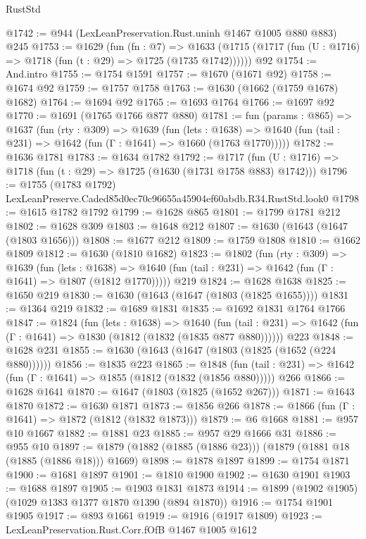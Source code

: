 \begin{lexlean}{RustStd}
\begin{coremodule}
@1742 := @944 (LexLeanPreservation.Rust.uninh @1467 @1005 @880 @883) @245
@1753 := @1629
    (fun (fn : @7) =>
    @1633 (@1715 (@1717 (fun (U : @1716) => @1718 (fun (t : @29) => @1725 (@1735 @1742))))))
    @92
@1754 := And.intro
@1755 := @1754 @1591
@1757 := @1670 (@1671 @92)
@1758 := @1674 @92
@1759 := @1757 @1758
@1763 := @1630 (@1662 (@1759 @1678) @1682)
@1764 := @1694 @92
@1765 := @1693 @1764
@1766 := @1697 @92
@1770 := @1691 (@1765 @1766 @877 @880)
@1781 := fun (params : @865) =>
  @1637
    (fun (rty : @309) =>
    @1639
      (fun (lets : @1638) =>
      @1640 (fun (tail : @231) => @1642 (fun (Γ : @1641) => @1660 (@1763 @1770)))))
@1782 := @1636 @1781
@1783 := @1634 @1782
@1792 := @1717 (fun (U : @1716) => @1718 (fun (t : @29) => @1725 (@1630 (@1731 @1758 @883) @1742)))
@1796 := @1755 (@1783 @1792) LexLeanPreserve.Caded85d0ec70c96655a45904ef60abdb.R34.RustStd.look0
@1798 := @1615 @1782 @1792
@1799 := @1628 @865
@1801 := @1799 @1781 @212
@1802 := @1628 @309
@1803 := @1648 @212
@1807 := @1630 (@1643 (@1647 (@1803 @1656)))
@1808 := @1677 @212
@1809 := @1759 @1808
@1810 := @1662 @1809
@1812 := @1630 (@1810 @1682)
@1823 := @1802
    (fun (rty : @309) =>
    @1639
      (fun (lets : @1638) =>
      @1640 (fun (tail : @231) => @1642 (fun (Γ : @1641) => @1807 (@1812 @1770)))))
    @219
@1824 := @1628 @1638
@1825 := @1650 @219
@1830 := @1630 (@1643 (@1647 (@1803 (@1825 @1655))))
@1831 := @1364 @219
@1832 := @1689 @1831
@1835 := @1692 @1831 @1764 @1766
@1847 := @1824
    (fun (lets : @1638) =>
    @1640 (fun (tail : @231) => @1642 (fun (Γ : @1641) => @1830 (@1812 (@1832 (@1835 @877 @880))))))
    @223
@1848 := @1628 @231
@1855 := @1630 (@1643 (@1647 (@1803 (@1825 (@1652 (@224 @880))))))
@1856 := @1835 @223
@1865 := @1848
    (fun (tail : @231) => @1642 (fun (Γ : @1641) => @1855 (@1812 (@1832 (@1856 @880)))))
    @266
@1866 := @1628 @1641
@1870 := @1647 (@1803 (@1825 (@1652 @267)))
@1871 := @1643 @1870
@1872 := @1630 @1871
@1873 := @1856 @266
@1878 := @1866 (fun (Γ : @1641) => @1872 (@1812 (@1832 @1873)))
@1879 := @6 @1668
@1881 := @957 @10 @1667
@1882 := @1881 @23
@1885 := @957 @29 @1666 @31
@1886 := @955 @10
@1897 := @1879 (@1882 (@1885 (@1886 @23))) (@1879 (@1881 @18 (@1885 (@1886 @18))) @1669)
@1898 := @1878 @1897
@1899 := @1754 @1871
@1900 := @1681 @1897
@1901 := @1810 @1900
@1902 := @1630 @1901
@1903 := @1688 @1897
@1905 := @1903 @1831 @1873
@1914 := @1899 (@1902 @1905) (@1029 @1383 @1377 @1870 @1390 (@894 @1870))
@1916 := @1754 @1901 @1905
@1917 := @893 @1661
@1919 := @1916 (@1917 @1809)
@1923 := LexLeanPreservation.Rust.Corr.fOfB @1467 @1005 @1612

\end{coremodule}
\end{lexlean}
